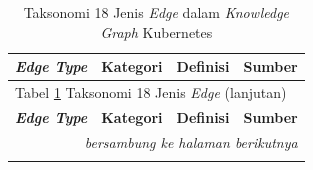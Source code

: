 \captionsetup[longtable]{justification=raggedright,singlelinecheck=false}

\begin{longtable}{ p{} p{} p{} p{} }

\caption{Taksonomi 18 Jenis \textit{Edge} dalam \textit{Knowledge Graph} Kubernetes}
\label{tbl:edge_taxonomy_full} \\
\hline
\textbf{\textit{Edge Type}} & \textbf{Kategori} & \textbf{Definisi} & \textbf{Sumber} \\
\hline
\endfirsthead

\multicolumn{4}{l}{Tabel \ref{tbl:edge_taxonomy_full} Taksonomi 18 Jenis \textit{Edge} (lanjutan)} \\
\hline
\textbf{\textit{Edge Type}} & \textbf{Kategori} & \textbf{Definisi} & \textbf{Sumber} \\
\hline
\endhead

\hline
\multicolumn{4}{r}{\textit{bersambung ke halaman berikutnya}} \\
\endfoot

\hline
\endlastfoot


\end{longtable}
